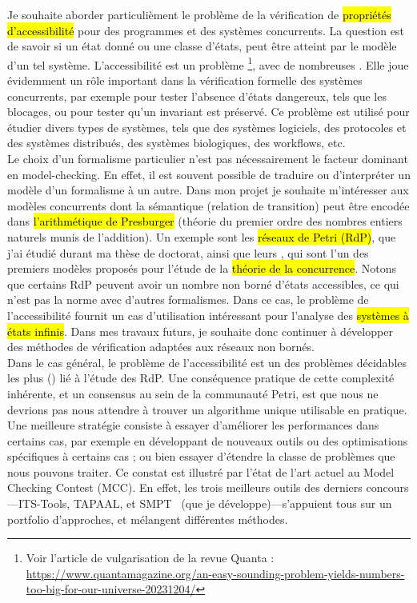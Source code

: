 Je souhaite aborder particulièment le problème de la vérification de
\hl{propriétés d'accessibilité} pour des programmes et des systèmes concurrents.
La question est de savoir si un état donné ou une classe d'états, peut être
atteint par le modèle d'un tel système. L'accessibilité est un problème
\footnote{Voir l'article de vulgarisation de la
revue Quanta :\\
\url{https://www.quantamagazine.org/an-easy-sounding-problem-yields-numbers-too-big-for-our-universe-20231204/}},
avec de nombreuses . Elle joue évidemment un rôle
important dans la vérification formelle des systèmes concurrents, par exemple
pour tester l'absence \og d'états dangereux\fg, tels que les blocages, ou pour
tester qu'un invariant est préservé. Ce problème est utilisé pour étudier divers
types de systèmes, tels que des systèmes
logiciels,
des protocoles et des systèmes distribués, des systèmes
biologiques, des
workflows, etc.\\

Le choix d'un formalisme particulier n'est pas nécessairement le facteur
dominant en model-checking. En effet, il est souvent possible de traduire ou
d'interpréter un modèle d'un formalisme à un autre. Dans mon projet je souhaite
m'intéresser aux modèles concurrents dont la sémantique (relation de transition)
peut être encodée dans \hl{l'arithmétique de Presburger} (théorie du premier
ordre des nombres entiers naturels munis de l'addition). Un exemple sont les
\hl{réseaux de Petri (RdP)}, que j'ai étudié durant ma thèse de doctorat, ainsi
que leurs , qui sont l'un des premiers modèles proposés pour
l'étude de la \hl{théorie de la concurrence}. Notons que certains RdP peuvent
avoir un nombre non borné d'états accessibles, ce qui n'est pas la norme avec
d'autres formalismes. Dans ce cas, le problème de l'accessibilité fournit un cas
d'utilisation intéressant pour l'analyse des \hl{systèmes à états infinis}. Dans
mes travaux futurs, je souhaite donc continuer à développer des méthodes de
vérification adaptées aux réseaux non bornés.\\

Dans le cas général, le problème de l'accessibilité est un des problèmes
décidables les plus  () lié à l'étude des
RdP. Une conséquence pratique de cette \og complexité inhérente\fg, et un
consensus au sein de la communauté Petri, est que nous ne devrions pas nous
attendre à trouver un algorithme unique utilisable en pratique.
Une meilleure stratégie consiste à essayer d'améliorer les performances dans
certains cas, par exemple en développant de nouveaux outils ou des optimisations
spécifiques à certains cas ; ou bien essayer d'étendre la classe de problèmes
que nous pouvons traiter. 
Ce constat est illustré par l'état de l'art actuel au Model Checking Contest
(MCC). En effet, les trois meilleurs outils des derniers
concours---\textsf{ITS-Tools},
\textsf{TAPAAL}, et \textsf{SMPT}~\cite{amat_smpt_2023}
(que je développe)---s'appuient tous sur un portfolio d'approches, et mélangent
différentes méthodes.\\

